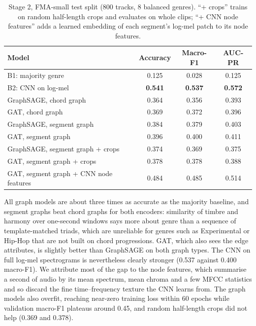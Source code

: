 \documentclass{article}
\begin{document}
\begin{table}[t]
  \caption{Stage 2, FMA-small test split (800 tracks, 8 balanced genres). ``+ crops'' trains on random half-length
  crops and evaluates on whole clips; ``+ CNN node features'' adds a learned embedding of each segment's log-mel patch
  to its node features.}
  \label{tab:graph}
  \centering
  \small
  \begin{tabular}{lccc}
    \toprule
    Model & Accuracy & Macro-F1 & AUC-PR \\
    \midrule
    B1: majority genre                 & 0.125 & 0.028 & 0.125 \\
    B2: CNN on log-mel                 & \textbf{0.541} & \textbf{0.537} & \textbf{0.572} \\
    \midrule
    GraphSAGE, chord graph             & 0.364 & 0.356 & 0.393 \\
    GAT, chord graph                   & 0.369 & 0.372 & 0.396 \\
    GraphSAGE, segment graph           & 0.384 & 0.379 & 0.403 \\
    GAT, segment graph                 & 0.396 & 0.400 & 0.411 \\
    GraphSAGE, segment graph + crops   & 0.374 & 0.369 & 0.375 \\
    GAT, segment graph + crops         & 0.378 & 0.378 & 0.388 \\
    \midrule
    GAT, segment graph + CNN node features & 0.484 & 0.485 & 0.514 \\
    \bottomrule
  \end{tabular}
\end{table}

All graph models are about three times as accurate as the majority baseline, and segment graphs beat chord graphs for
both encoders: similarity of timbre and harmony over one-second windows says more about genre than a sequence of
template-matched triads, which are unreliable for genres such as Experimental or Hip-Hop that are not built on chord
progressions. GAT, which also sees the edge attributes, is slightly better than GraphSAGE on both graph types. The CNN
on full log-mel spectrograms is nevertheless clearly stronger (0.537 against 0.400 macro-F1). We attribute most of the
gap to the node features, which summarise a second of audio by its mean spectrum, mean chroma and a few MFCC
statistics and so discard the fine time--frequency texture the CNN learns from. The graph models also overfit, reaching
near-zero training loss within 60 epochs while validation macro-F1 plateaus around 0.45, and random half-length crops
did not help (0.369 and 0.378).
\end{document}

